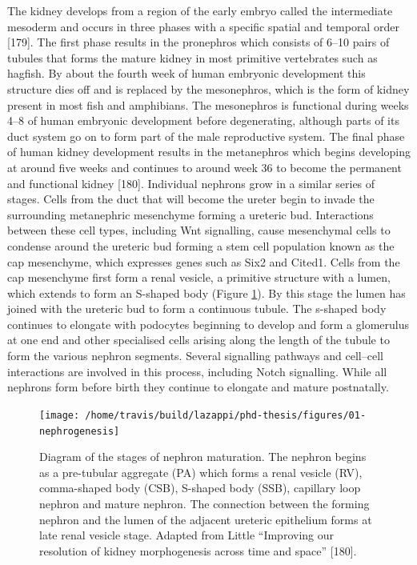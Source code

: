 \documentclass[11pt,a4paper,titlepage,twoside,openright]{style/unimelbthesis}
\theoremstyle{definition}
\theoremstyle{definition}
\theoremstyle{definition}
\theoremstyle{remark}
\begin{document}
\begin{mainmatter}
The kidney develops from a region of the early embryo called the intermediate mesoderm and occurs in three phases with a specific spatial and temporal order {[}179{]}. The first phase results in the pronephros which consists of 6--10 pairs of tubules that forms the mature kidney in most primitive vertebrates such as hagfish. By about the fourth week of human embryonic development this structure dies off and is replaced by the mesonephros, which is the form of kidney present in most fish and amphibians. The mesonephros is functional during weeks 4--8 of human embryonic development before degenerating, although parts of its duct system go on to form part of the male reproductive system. The final phase of human kidney development results in the metanephros which begins developing at around five weeks and continues to around week 36 to become the permanent and functional kidney {[}180{]}. Individual nephrons grow in a similar series of stages. Cells from the duct that will become the ureter begin to invade the surrounding metanephric mesenchyme forming a ureteric bud. Interactions between these cell types, including Wnt signalling, cause mesenchymal cells to condense around the ureteric bud forming a stem cell population known as the cap mesenchyme, which expresses genes such as Six2 and Cited1. Cells from the cap mesenchyme first form a renal vesicle, a primitive structure with a lumen, which extends to form an S-shaped body (Figure \ref{fig:nephrogenesis}). By this stage the lumen has joined with the ureteric bud to form a continuous tubule. The s-shaped body continues to elongate with podocytes beginning to develop and form a glomerulus at one end and other specialised cells arising along the length of the tubule to form the various nephron segments. Several signalling pathways and cell--cell interactions are involved in this process, including Notch signalling. While all nephrons form before birth they continue to elongate and mature postnatally.

\begin{figure}

{\centering \texttt{[image: /home/travis/build/lazappi/phd-thesis/figures/01-nephrogenesis]} 

}

\caption[Diagram of the stages of nephron maturation.]{Diagram of the stages of nephron maturation. The nephron begins as a pre-tubular aggregate (PA) which forms a renal vesicle (RV), comma-shaped body (CSB), S-shaped body (SSB), capillary loop nephron and mature nephron. The connection between the forming nephron and the lumen of the adjacent ureteric epithelium forms at late renal vesicle stage. Adapted from Little \enquote{Improving our resolution of kidney morphogenesis across time and space} {[}180{]}.}\label{fig:nephrogenesis}
\end{figure}






\end{mainmatter}
\end{document}
